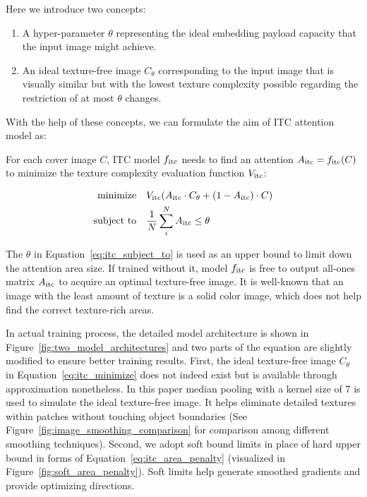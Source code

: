 Here we introduce two concepts:
\begin{enumerate}
  \item A hyper-parameter \( \theta \) representing the ideal embedding payload capacity that the input image might achieve.
  \item An ideal texture-free image \(C_{\theta}\) corresponding to the input image that is visually similar but with the lowest texture complexity possible regarding the restriction of at most \( \theta \) changes.
\end{enumerate}

With the help of these concepts, we can formulate the aim of ITC attention model as:

For each cover image \(C\), ITC model \(f_{\text{itc}}\) needs to find an attention \(A_{\text{itc}} = f_{\text{itc}}(C)\) to minimize the texture complexity evaluation function \(V_{\text{itc}}\):

\begin{align}
  \text{minimize}   \quad & V_{\text{itc}}(A_{\text{itc}} \cdot C_{\theta} + (1 - A_{\text{itc}}) \cdot C)
  \label{eq:itc_minimize}                                                                         \\
  \text{subject to} \quad & \frac{1}{N} \sum_{i}^{N} A_{\text{itc}} \leq \theta \label{eq:itc_subject_to}
\end{align}

The \( \theta \) in Equation~\ref{eq:itc_subject_to} is used as an upper bound to limit down the attention area size. If trained without it, model \(f_{\text{itc}}\) is free to output all-ones matrix \(A_{\text{itc}}\) to acquire an optimal texture-free image. It is well-known that an image with the least amount of texture is a solid color image, which does not help find the correct texture-rich areas.

In actual training process, the detailed model architecture is shown in Figure~\ref{fig:two_model_architectures} and two parts of the equation are slightly modified to ensure better training results. First, the ideal texture-free image \(C_{\theta}\) in Equation~\ref{eq:itc_minimize} does not indeed exist but is available through approximation nonetheless. In this paper median pooling with a kernel size of 7 is used to simulate the ideal texture-free image. It helps eliminate detailed textures within patches without touching object boundaries (See Figure~\ref{fig:image_smoothing_comparison} for comparison among different smoothing techniques). Second, we adopt soft bound limits in place of hard upper bound in forms of Equation~\ref{eq:itc_area_penalty} (visualized in Figure~\ref{fig:soft_area_penalty}). Soft limits help generate smoothed gradients and provide optimizing directions.

